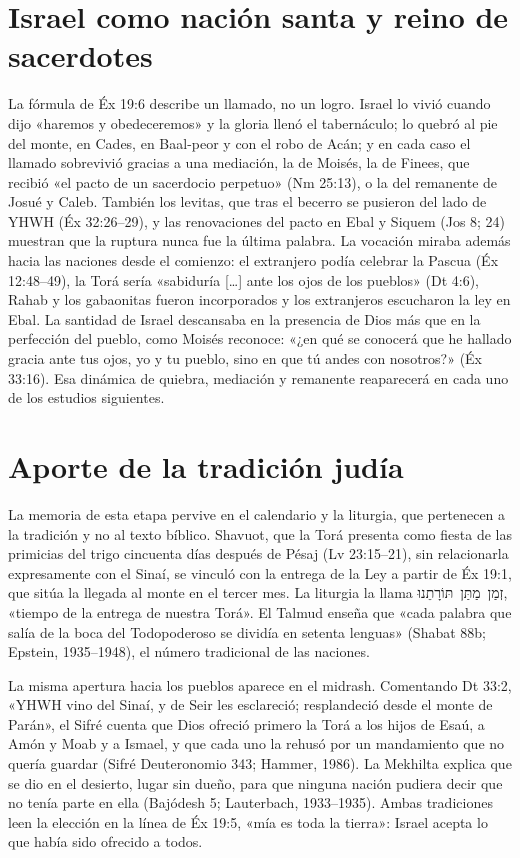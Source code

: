 \documentclass[11pt,letterpaper]{article}
\newcommand{\heb}[1]{\mbox{\foreignlanguage{hebrew}{#1}}}
\begin{document}
\section{Israel como nación santa y reino de sacerdotes}

La fórmula de Éx 19:6 describe un llamado, no un logro. Israel lo vivió cuando dijo «haremos y obedeceremos» y la gloria llenó el tabernáculo; lo quebró al pie del monte, en Cades, en Baal-peor y con el robo de Acán; y en cada caso el llamado sobrevivió gracias a una mediación, la de Moisés, la de Finees, que recibió «el pacto de un sacerdocio perpetuo» (Nm 25:13), o la del remanente de Josué y Caleb. También los levitas, que tras el becerro se pusieron del lado de YHWH (Éx 32:26–29), y las renovaciones del pacto en Ebal y Siquem (Jos 8; 24) muestran que la ruptura nunca fue la última palabra. La vocación miraba además hacia las naciones desde el comienzo: el extranjero podía celebrar la Pascua (Éx 12:48–49), la Torá sería «sabiduría [\ldots] ante los ojos de los pueblos» (Dt 4:6), Rahab y los gabaonitas fueron incorporados y los extranjeros escucharon la ley en Ebal. La santidad de Israel descansaba en la presencia de Dios más que en la perfección del pueblo, como Moisés reconoce: «¿en qué se conocerá que he hallado gracia ante tus ojos, yo y tu pueblo, sino en que tú andes con nosotros?» (Éx 33:16). Esa dinámica de quiebra, mediación y remanente reaparecerá en cada uno de los estudios siguientes.

\section{Aporte de la tradición judía}

La memoria de esta etapa pervive en el calendario y la liturgia, que pertenecen a la tradición y no al texto bíblico. Shavuot, que la Torá presenta como fiesta de las primicias del trigo cincuenta días después de Pésaj (Lv 23:15–21), sin relacionarla expresamente con el Sinaí, se vinculó con la entrega de la Ley a partir de Éx 19:1, que sitúa la llegada al monte en el tercer mes. La liturgia la llama \heb{זְמַן מַתַּן תּוֹרָתֵנוּ}, «tiempo de la entrega de nuestra Torá». El Talmud enseña que «cada palabra que salía de la boca del Todopoderoso se dividía en setenta lenguas» (Shabat 88b; Epstein, 1935–1948), el número tradicional de las naciones.

La misma apertura hacia los pueblos aparece en el midrash. Comentando Dt 33:2, «YHWH vino del Sinaí, y de Seir les esclareció; resplandeció desde el monte de Parán», el Sifré cuenta que Dios ofreció primero la Torá a los hijos de Esaú, a Amón y Moab y a Ismael, y que cada uno la rehusó por un mandamiento que no quería guardar (Sifré Deuteronomio 343; Hammer, 1986). La Mekhilta explica que se dio en el desierto, lugar sin dueño, para que ninguna nación pudiera decir que no tenía parte en ella (Bajódesh 5; Lauterbach, 1933–1935). Ambas tradiciones leen la elección en la línea de Éx 19:5, «mía es toda la tierra»: Israel acepta lo que había sido ofrecido a todos.
\end{document}
